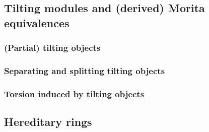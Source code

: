    \subsection{Tilting modules and (derived) Morita equivalences}
        \subsubsection{(Partial) tilting objects}
        
        \subsubsection{Separating and splitting tilting objects}
        
        \subsubsection{Torsion induced by tilting objects}
        
    \subsection{Hereditary rings}    
